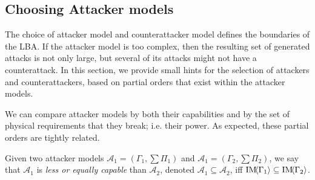 {{%

\subsection{Choosing Attacker models}
The choice of attacker model and counterattacker model defines the boundaries of the LBA. If the attacker model is too complex, then the resulting set of generated attacks is not only large, but several of its attacks might not have a counterattack. In this section, we provide small hints for the selection of attackers and counterattackers, based on partial orders that exist within the attacker models.

We can compare attacker models by both their capabilities and by the set of physical requirements that they break; i.e. their power. As expected, these partial orders are tightly related.
\begin{definition}
  Given two attacker models $\mathcal{A}_1=(\Gamma_1,\sum \Pi_1)$ and $\mathcal{A}_1=(\Gamma_2,\sum \Pi_2)$, we say that $\mathcal{A}_1$ is \emph{less or equally capable} than $\mathcal{A}_2$, denoted $\mathcal{A}_1\subseteq \mathcal{A}_2$, iff $\text{IM}\!{{\left<\Gamma_1\right>}}\subseteq \text{IM}\!{{\left<\Gamma_2\right>}}$. 
  

\end{definition}}}
